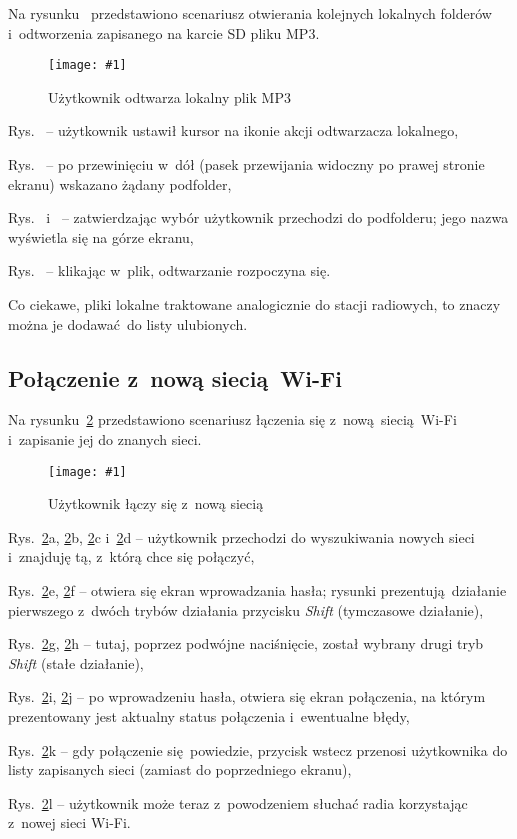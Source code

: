 \documentclass[polish]{aghengthesis}
\let\tempone\itemize
\let\temptwo\enditemize
\renewenvironment{itemize}{\tempone\setlength{\itemsep}{0cm}}{\temptwo}
\newcommand{\imgint}[4]{
	\begin{figure}[{#4}]
		\centering
		\texttt{[image: \#1]}
		\caption{#2}
		\label{#1}
	\end{figure}
}
\newcommand{\imgh}[3]{\imgint{#1}{#2}{#3}{H}}
\begin{document}
			Na rysunku~\rflocal{} przedstawiono scenariusz otwierania kolejnych lokalnych folderów i~odtworzenia zapisanego na karcie SD pliku MP3.
			
			\imgh{5/PicoRadio-fl-local}{Użytkownik odtwarza lokalny plik MP3}{0.9}	
			
			\begin{itemize}
				\item Rys.~ -- użytkownik ustawił kursor na ikonie akcji odtwarzacza lokalnego,
				\item Rys.~ -- po przewinięciu w~dół (pasek przewijania widoczny po prawej stronie ekranu) wskazano żądany podfolder,
				\item Rys.~ i~ -- zatwierdzając wybór użytkownik przechodzi do podfolderu; jego nazwa wyświetla się na górze ekranu,
				\item Rys.~ -- klikając w~plik, odtwarzanie rozpoczyna się.
			\end{itemize}
			
			Co ciekawe, pliki lokalne traktowane analogicznie do stacji radiowych, to znaczy można je dodawać do listy ulubionych.
			
		\subsection{Połączenie z~nową siecią Wi-Fi}
			\newcommand{\rflwifi}[1]{\ref{5/PicoRadio-fl-wifi}#1}
			
			Na rysunku~\rflwifi{} przedstawiono scenariusz łączenia się z~nową siecią Wi-Fi i~zapisanie jej do znanych sieci.
			
			\imgh{5/PicoRadio-fl-wifi}{Użytkownik łączy się z~nową siecią}{0.9}
			
			\begin{itemize}
				\item Rys.~\rflwifi{a}, \rflwifi{b}, \rflwifi{c} i~\rflwifi{d} -- użytkownik przechodzi do wyszukiwania nowych sieci i~znajduję tą, z~którą chce się połączyć,
				\item Rys.~\rflwifi{e}, \rflwifi{f} -- otwiera się ekran wprowadzania hasła; rysunki prezentują działanie pierwszego z~dwóch trybów działania przycisku \textit{Shift} (tymczasowe działanie),
				\item Rys.~\rflwifi{g}, \rflwifi{h} -- tutaj, poprzez podwójne naciśnięcie, został wybrany drugi tryb \textit{Shift} (stałe działanie),
				\item Rys.~\rflwifi{i}, \rflwifi{j} -- po wprowadzeniu hasła, otwiera się ekran połączenia, na którym prezentowany jest aktualny status połączenia i~ewentualne błędy,
				\item Rys.~\rflwifi{k} -- gdy połączenie się powiedzie, przycisk wstecz przenosi użytkownika do listy zapisanych sieci (zamiast do poprzedniego ekranu),
				\item Rys.~\rflwifi{l} -- użytkownik może teraz z~powodzeniem słuchać radia korzystając z~nowej sieci Wi-Fi.
			\end{itemize}
			
\end{document}

